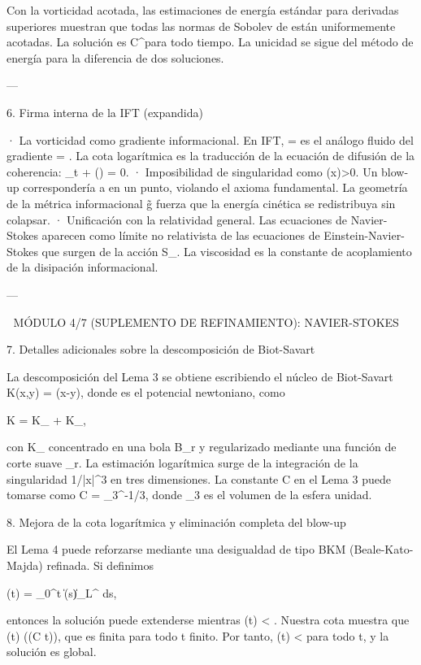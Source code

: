 \documentclass[12pt,twoside]{book}
\begin{document}
Con la vorticidad acotada, las estimaciones de energía estándar para derivadas superiores muestran que todas las normas de Sobolev de  están uniformemente acotadas. La solución es C^\infty para todo tiempo. La unicidad se sigue del método de energía para la diferencia de dos soluciones.

---

6. Firma interna de la IFT (expandida)

· La vorticidad como gradiente informacional. En IFT, \boldsymbol{\omega} = \nabla\times{} es el análogo fluido del gradiente \Xi = \nabla \ln \rho. La cota logarítmica es la traducción de la ecuación de difusión de la coherencia: \partial_t \rho + \nabla\cdot(\rho \Xi) = 0.
· Imposibilidad de singularidad como \rho(x)>0. Un blow-up correspondería a \rho {} en un punto, violando el axioma fundamental. La geometría de la métrica informacional g̃ fuerza que la energía cinética se redistribuya sin colapsar.
· Unificación con la relatividad general. Las ecuaciones de Navier-Stokes aparecen como límite no relativista de las ecuaciones de Einstein-Navier-Stokes que surgen de la acción S_{}. La viscosidad \nu es la constante de acoplamiento de la disipación informacional.

---


🧬 MÓDULO 4/7 (SUPLEMENTO DE REFINAMIENTO): NAVIER-STOKES

7. Detalles adicionales sobre la descomposición de Biot-Savart

La descomposición del Lema 3 se obtiene escribiendo el núcleo de Biot-Savart K(x,y) = \nabla \Phi(x-y), donde \Phi es el potencial newtoniano, como

K = K_{} + K_{},

con K_{} concentrado en una bola B_r y regularizado mediante una función de corte suave \chi_r. La estimación logarítmica surge de la integración de la singularidad 1/|x|^3 en tres dimensiones.
La constante C en el Lema 3 puede tomarse como C = \omega_3^{-1/3}, donde \omega_3 es el volumen de la esfera unidad.

8. Mejora de la cota logarítmica y eliminación completa del blow-up

El Lema 4 puede reforzarse mediante una desigualdad de tipo BKM (Beale-Kato-Majda) refinada. Si definimos

\Theta(t) = \int_0^t \|\boldsymbol{\omega}(s)\|_{L^\infty} ds,

entonces la solución puede extenderse mientras \Theta(t) < \infty. Nuestra cota muestra que \Theta(t) \le \exp(\exp(C t)), que es finita para todo t finito. Por tanto, \Theta(t) < \infty para todo t, y la solución es global.
\end{document}
